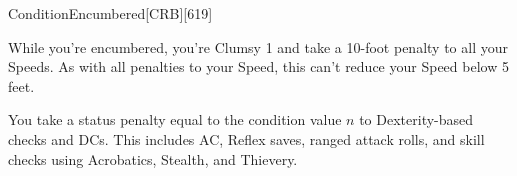 
\begin{card}{Condition}{}{Encumbered}[CRB][619]



While you're encumbered, you're Clumsy 1 and take a 10-foot penalty to all your Speeds.
As with all penalties to your Speed, this can't reduce your Speed below 5 feet.



You take a status penalty equal to the condition value \(n\) to Dexterity-based checks and DCs.
This includes AC, Reflex saves, ranged attack rolls, and skill checks using Acrobatics, Stealth, and Thievery.

\end{card}
